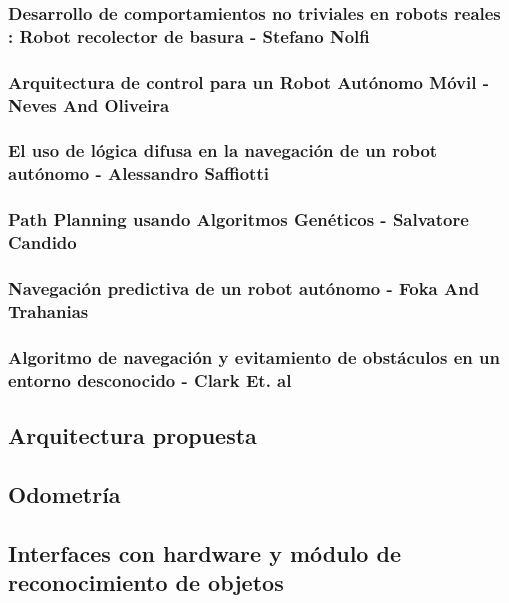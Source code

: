 \subsubsection{Desarrollo de comportamientos no triviales en robots reales : Robot recolector de basura - Stefano Nolfi}

\subsubsection{Arquitectura de control para un Robot Aut\'onomo M\'ovil - Neves And Oliveira}

\subsubsection{El uso de l\'ogica difusa en la navegaci\'on de un robot aut\'onomo - Alessandro Saffiotti}

\subsubsection{Path Planning usando Algoritmos Gen\'eticos - Salvatore Candido}

\subsubsection{Navegaci\'on predictiva de un robot aut\'onomo - Foka And Trahanias}

\subsubsection{Algoritmo de navegaci\'on y evitamiento de obst\'aculos en un entorno desconocido - Clark Et. al}

\newpage
\subsection{Arquitectura propuesta}
\label{arq_prop}

\newpage


\newpage
\subsection{Odometr\'ia}
\label{odometry}

\newpage
\subsection{Interfaces con hardware y m\'odulo de reconocimiento de objetos}
\label{interfaces}

